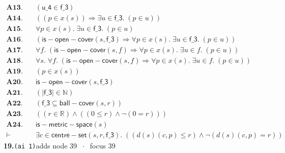 \documentclass[11pt]{article}
\begin{document}
\begin{align*}
  \mathbf{A13.}\quad & (\mathsf{u\_4} \in \mathsf{f\_3}) \\
  \mathbf{A14.}\quad & ((p \in x(s)) \Rightarrow \exists u \in \mathsf{f\_3}.\; (p \in u)) \\
  \mathbf{A15.}\quad & \forall p \in x(s).\; \exists u \in \mathsf{f\_3}.\; (p \in u) \\
  \mathbf{A16.}\quad & (\mathsf{is{-}open{-}cover}(s, \mathsf{f\_3}) \Rightarrow \forall p \in x(s).\; \exists u \in \mathsf{f\_3}.\; (p \in u)) \\
  \mathbf{A17.}\quad & \forall f.\; (\mathsf{is{-}open{-}cover}(s, f) \Rightarrow \forall p \in x(s).\; \exists u \in f.\; (p \in u)) \\
  \mathbf{A18.}\quad & \forall s.\; \forall f.\; (\mathsf{is{-}open{-}cover}(s, f) \Rightarrow \forall p \in x(s).\; \exists u \in f.\; (p \in u)) \\
  \mathbf{A19.}\quad & (p \in x(s)) \\
  \mathbf{A20.}\quad & \mathsf{is{-}open{-}cover}(s, \mathsf{f\_3}) \\
  \mathbf{A21.}\quad & (|\mathsf{f\_3}| \in \mathbb{N}) \\
  \mathbf{A22.}\quad & (\mathsf{f\_3} \subseteq \mathsf{ball{-}cover}(s, r)) \\
  \mathbf{A23.}\quad & ((r \in \mathbb{R}) \wedge ((0 \leq r) \wedge \neg (0 = r))) \\
  \mathbf{A24.}\quad & \mathsf{is{-}metric{-}space}(s) \\
  \vdash\quad & \exists c \in \mathsf{centre{-}set}(s, r, \mathsf{f\_3}).\; ((d(s)(c, p) \leq r) \wedge \neg (d(s)(c, p) = r))
\end{align*}
\medskip\noindent\textbf{19.}\quad \texttt{(ai 1)}\hfill{\small adds node 39 $\;\cdot\;$ focus 39}\\[2pt]
\end{document}
